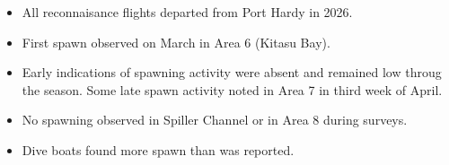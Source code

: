 \begin{itemize}

\item All reconnaisance flights departed from Port Hardy in 2026.

\item First spawn observed on March  in Area 6 (Kitasu Bay).

\item Early indications of spawning activity were absent and
remained low throug the season.
Some late spawn activity noted in Area 7 in third week of April.

\item No spawning observed in Spiller Channel or
in Area 8 during surveys.

\item Dive boats found more spawn than was reported.

\end{itemize}